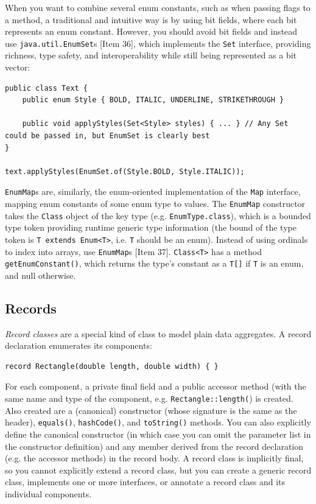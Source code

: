 \documentclass[table, xcdraw]{article}%
\begin{document}
When you want to combine several enum constants, such as when passing flags to a method, a traditional and intuitive way is by using bit fields, where each bit represents an enum constant. However, you should avoid bit fields and instead use \texttt{java.util.EnumSet}s [Item 36], which implements the \texttt{Set} interface, providing richness, type safety, and interoperability while still being represented as a bit vector:

\begin{verbatim}
public class Text {
    public enum Style { BOLD, ITALIC, UNDERLINE, STRIKETHROUGH }

    public void applyStyles(Set<Style> styles) { ... } // Any Set could be passed in, but EnumSet is clearly best
}

text.applyStyles(EnumSet.of(Style.BOLD, Style.ITALIC));
\end{verbatim}

\texttt{EnumMap}s are, similarly, the enum-oriented implementation of the \texttt{Map} interface, mapping enum constants of some enum type to values. The \texttt{EnumMap} constructor takes the \texttt{Class} object of the key type (e.g. \texttt{EnumType.class}), which is a bounded type token providing runtime generic type information (the bound of the type token is \texttt{T extends Enum<T>}, i.e. \texttt{T} should be an enum). Instead of using ordinals to index into arrays, use \texttt{EnumMap}s [Item 37]. \texttt{Class<T>} has a method \texttt{getEnumConstant()}, which returns the type's constant as a \texttt{T[]} if \texttt{T} is an enum, and null otherwise.

\subsection{Records}

\emph{Record classes} are a special kind of class to model plain data aggregates. A record declaration enumerates its components:

\begin{verbatim}
record Rectangle(double length, double width) { }
\end{verbatim}

For each component, a private final field and a public accessor method (with the same name and type of the component, e.g. \texttt{Rectangle::length(}) is created. Also created are a (canonical) constructor (whose signature is the same as the header), \texttt{equals()}, \texttt{hashCode()}, and \texttt{toString()} methods. You can also explicitly define the canonical constructor (in which case you can omit the parameter list in the constructor definition) and any member derived from the record declaration (e.g. the accessor methods) in the record body. A record class is implicitly final, so you cannot explicitly extend a record class, but you can create a generic record class, implements one or more interfaces, or annotate a record class and its individual components.
\end{document}
